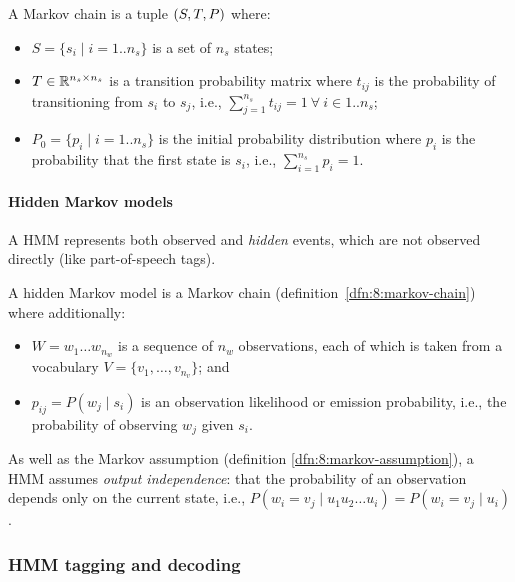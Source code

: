 \begin{dfn}
  \label{dfn:8:markov-chain}
  A Markov chain is a tuple $(S, T, P)$ where:
  \begin{itemize}
    \item $S = \{ s_i \mid i = 1 .. n_s \}$ is a set of $n_s$ states;
    \item $T \in \mathbb{R}^{n_s \times n_s}$ is a transition probability
          matrix where $t_{ij}$ is the probability of transitioning from $s_i$
          to $s_j$, i.e.,
          $\sum_{j = 1}^{n_s} t_{ij} = 1 \ \forall\ i \in 1 .. n_s$;
    \item $P_0 = \{ p_i \mid i = 1 .. n_s \}$ is the initial probability
          distribution where $p_i$ is the probability that the first state is
          $s_i$, i.e.,
          $\sum_{i = 1}^{n_s} p_i = 1$.
  \end{itemize}
\end{dfn}

\paragraph{Hidden Markov models}

A HMM represents both observed and \textit{hidden} events, which are not
observed directly (like part-of-speech tags).

\begin{dfn}
  \label{dfn:8:hidden-markov-model}
  A hidden Markov model is a Markov chain (definition~\ref{dfn:8:markov-chain})
  where additionally:
  \begin{itemize}
    \item $W = w_1 \dots w_{n_w}$ is a sequence of $n_w$ observations, each of
          which is taken from a vocabulary $V = \{ v_1, \dots, v_{n_v} \}$; and
    \item $p_{ij} = P(w_j \mid s_i)$ is an observation likelihood or emission
          probability, i.e., the probability of observing $w_j$ given $s_i$.
  \end{itemize}
\end{dfn}

As well as the Markov assumption (definition \ref{dfn:8:markov-assumption}), a
HMM assumes \textit{output independence}: that the probability of an observation
depends only on the current state, i.e.,
$P(w_i = v_j \mid u_1 u_2 \dots u_i) = P(w_i = v_j \mid u_i)$.

\subsubsection{HMM tagging and decoding}

